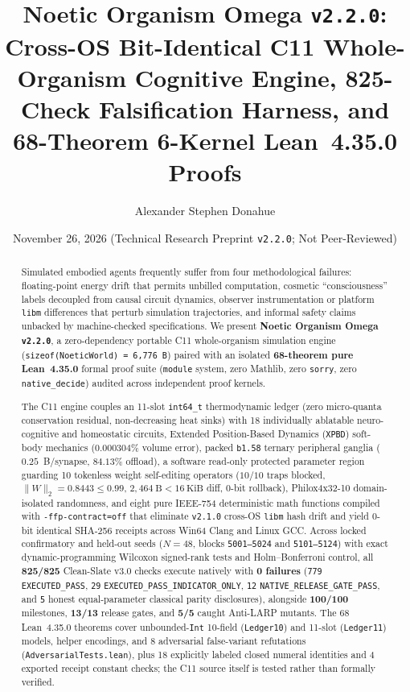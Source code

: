 \documentclass[11pt,reqno]{amsart}
\title[Noetic Organism Omega v2.2.0]{Noetic Organism Omega \texttt{v2.2.0}: Cross-OS Bit-Identical C11 Whole-Organism Cognitive Engine, 825-Check Falsification Harness, and 68-Theorem 6-Kernel Lean~4.35.0 Proofs}
\author{Alexander Stephen Donahue}
\date{November 26, 2026 \quad (Technical Research Preprint \texttt{v2.2.0}; Not Peer-Reviewed)}
\theoremstyle{remark}
\begin{document}
\begin{abstract}
Simulated embodied agents frequently suffer from four methodological failures: floating-point energy drift that permits unbilled computation, cosmetic ``consciousness'' labels decoupled from causal circuit dynamics, observer instrumentation or platform \texttt{libm} differences that perturb simulation trajectories, and informal safety claims unbacked by machine-checked specifications. We present \textbf{Noetic Organism Omega \texttt{v2.2.0}}, a zero-dependency portable C11 whole-organism simulation engine (\texttt{sizeof(NoeticWorld) = 6,776~B}) paired with an isolated \textbf{68-theorem pure Lean~4.35.0} formal proof suite (\texttt{module} system, zero Mathlib, zero \texttt{sorry}, zero \texttt{native\_decide}) audited across independent proof kernels.

The C11 engine couples an 11-slot \texttt{int64\_t} thermodynamic ledger (zero micro-quanta conservation residual, non-decreasing heat sinks) with 18 individually ablatable neuro-cognitive and homeostatic circuits, Extended Position-Based Dynamics (\texttt{XPBD}) soft-body mechanics ($0.000304\%$ volume error), packed \texttt{b1.58} ternary peripheral ganglia ($0.25$~B/synapse, $84.13\%$ offload), a software read-only protected parameter region guarding 10 tokenless weight self-editing operators ($10/10$ traps blocked, $\|W\|_2 = 0.8443 \le 0.99$, $2{,}464~\text{B} < 16~\text{KiB}$ diff, 0-bit rollback), Philox4x32-10 domain-isolated randomness, and eight pure IEEE-754 deterministic math functions compiled with \texttt{-ffp-contract=off} that eliminate \texttt{v2.1.0} cross-OS \texttt{libm} hash drift and yield 0-bit identical SHA-256 receipts across Win64 Clang and Linux GCC. Across locked confirmatory and held-out seeds ($N = 48$, blocks \texttt{5001--5024} and \texttt{5101--5124}) with exact dynamic-programming Wilcoxon signed-rank tests and Holm--Bonferroni control, all \textbf{825/825} Clean-Slate v3.0 checks execute natively with \textbf{0 failures} (\texttt{779} \texttt{EXECUTED\_PASS}, \texttt{29} \texttt{EXECUTED\_PASS\_INDICATOR\_ONLY}, \texttt{12} \texttt{NATIVE\_RELEASE\_GATE\_PASS}, and \texttt{5} honest equal-parameter classical parity disclosures), alongside \textbf{100/100} milestones, \textbf{13/13} release gates, and \textbf{5/5} caught Anti-LARP mutants. The 68 Lean~4.35.0 theorems cover unbounded-\texttt{Int} 10-field (\texttt{Ledger10}) and 11-slot (\texttt{Ledger11}) models, helper encodings, and 8 adversarial false-variant refutations (\texttt{AdversarialTests.lean}), plus 18 explicitly labeled closed numeral identities and 4 exported receipt constant checks; the C11 source itself is tested rather than formally verified.


\end{abstract}
\end{document}
